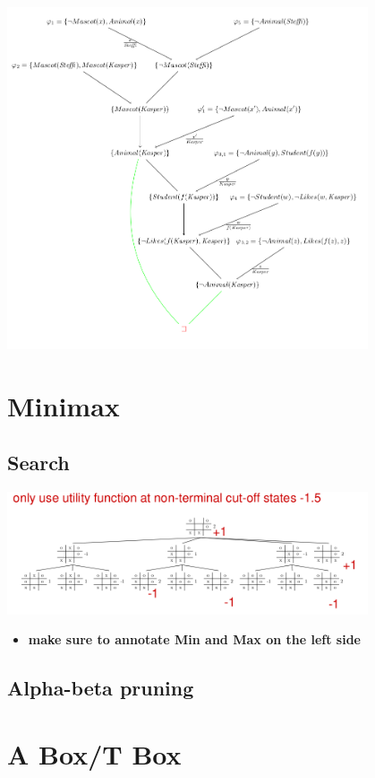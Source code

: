 \documentclass[conference]{styles/acmsiggraph}
\begin{document}
\includegraphics[width=0.8\textwidth]{imgs/pl1.png}


\section{Minimax}

\subsection{Search}
\includegraphics[width=0.8\textwidth]{imgs/minmax.png}

\begin{itemize}
    \item \textbf{make sure to annotate Min and Max on the left side}
\end{itemize}

\subsection{Alpha-beta pruning}



\section{A Box/T Box}
\end{document}

